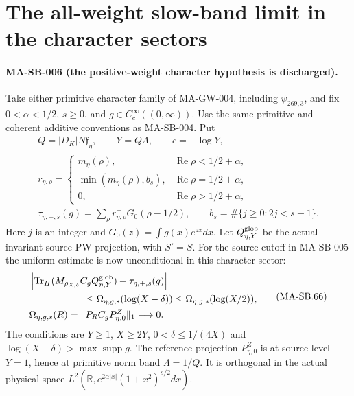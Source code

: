 \section{The all-weight slow-band limit in the character sectors}
\label{sec:weighted-character-slow-band}

\paragraph{MA-SB-006 (the positive-weight character hypothesis is discharged).}
Take either primitive character family of MA-GW-004,
including $\psi_{269,3}$, and fix
$0<\alpha<1/2$, $s\ge0$, and
$g\in C_c^\infty((0,\infty))$.
Use the same primitive and coherent additive conventions
as MA-SB-004.  Put
\[
 \begin{gathered}
 Q=|D_K|N\mathfrak f_\eta,\qquad Y=Q\Lambda,
 \qquad c=-\log Y,\\
 r_{\eta,\rho}^+=
 \begin{cases}
 m_\eta(\rho),&\operatorname{Re}\rho<1/2+\alpha,\\
 \min(m_\eta(\rho),b_s),&\operatorname{Re}\rho=1/2+\alpha,\\
 0,&\operatorname{Re}\rho>1/2+\alpha,
 \end{cases}\\
 \tau_{\eta,+,s}(g)=
              \sum_\rho r_{\eta,\rho}^+G_0(\rho-1/2),
 \qquad b_s=\#\{j\ge0:2j<s-1\}.
 \end{gathered}
 \tag{MA-SB.65}
\]
Here $j$ is an integer and $G_0(z)=\int g(x)e^{zx}dx$.
Let $Q_{\eta,Y}^{\rm glob}$ be the actual invariant
source PW projection, with $S'=S$.
For the source cutoff in MA-SB-005 the uniform estimate
is now unconditional in this character sector:
\[
 \begin{split}
 &\left|\operatorname{Tr}_H
    (M_{\rho_{X,\delta}}C_gQ_{\eta,Y}^{\rm glob})
                         +\tau_{\eta,+,s}(g)\right|\\
 &\hspace{20mm}\le
     \Omega_{\eta,g,s}(\log(X-\delta))
                       \le\Omega_{\eta,g,s}(\log(X/2)),\\
 &\Omega_{\eta,g,s}(R)=
       \|P_RC_gP_{\eta,0}^Z\|_1\longrightarrow0.
 \end{split}
 \tag{MA-SB.66}
\]
The conditions are $Y\ge1$, $X\ge2Y$,
$0<\delta\le1/(4X)$ and
$\log(X-\delta)>\max\operatorname{supp}g$.
The reference projection $P_{\eta,0}^Z$ is at source
level $Y=1$, hence at primitive norm band $\Lambda=1/Q$.
It is orthogonal in the actual physical space
$L^2(\mathbb R,e^{2\alpha|x|}(1+x^2)^{s/2}dx)$.


